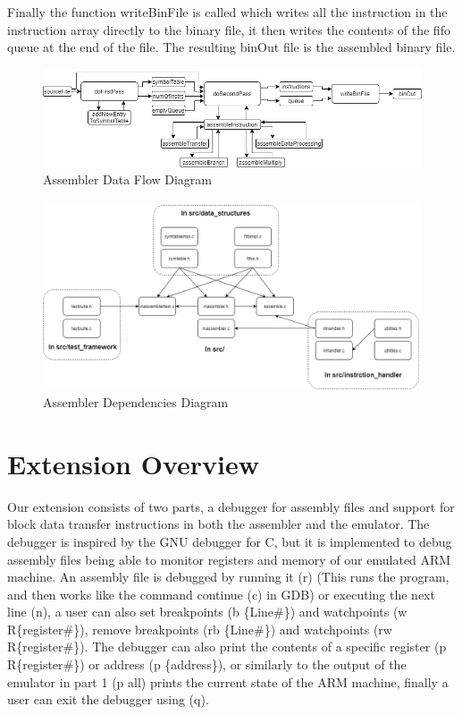 \documentclass[11pt]{article}
\begin{document}
Finally the function writeBinFile is called which writes all the instruction in the instruction array directly to the binary file, it then writes the contents of the fifo queue at the end of the file. The resulting binOut file is the assembled binary file. \\

\begin{figure}[htp]
    \centering
    \includegraphics[width=17cm]{Assembler.png}
    \caption{Assembler Data Flow Diagram}

\end{figure}
\newpage

\begin{figure}[htp]
    \centering
    \includegraphics[width=17cm]{assemblerd.png}
    \caption{Assembler Dependencies Diagram}
\end{figure}


\section{Extension Overview}
Our extension consists of two parts, a debugger for assembly files and support for block data transfer instructions in both the assembler and the emulator. The debugger is inspired by the GNU debugger for C, but it is implemented to debug assembly files being able to monitor registers and memory of our emulated ARM machine. An assembly file is debugged by running it (r) (This runs the program, and then works like the command continue (c) in GDB) or executing the next line (n), a user can also set breakpoints (b \{Line\#\}) and watchpoints (w R\{register\#\}), remove breakpoints (rb \{Line\#\}) and watchpoints (rw R\{register\#\}). The debugger can also print the contents of a specific register (p R\{register\#\}) or address (p \{address\}), or similarly to the output of the emulator in part 1 (p all) prints the current state of the ARM machine, finally a user can exit the debugger using (q).\\
\end{document}
